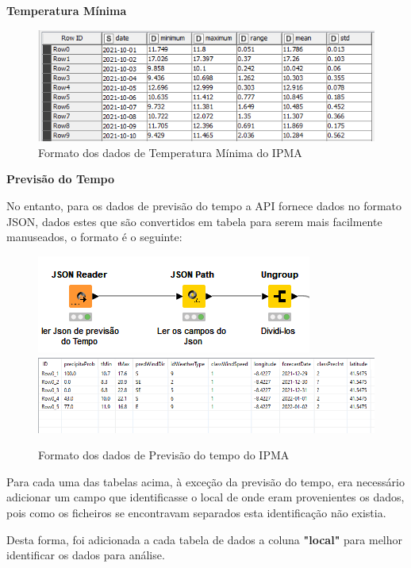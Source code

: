 \textbf{Temperatura Mínima}

\begin{figure}[H]
    \centering
    \includegraphics[scale=0.7]{imagens/TempMinFormatIPMA.png}
    \caption{Formato dos dados de Temperatura Mínima do IPMA}
\end{figure}

\newpage

\textbf{Previsão do Tempo}

No entanto, para os dados de previsão do tempo a API fornece dados no formato JSON, dados estes que são convertidos em tabela para serem mais facilmente manuseados, o formato é o seguinte:


\begin{figure}[H]
    \centering
    \includegraphics[]{imagens/PrevJsonFormatReader.png}
    \includegraphics[scale=0.6]{imagens/PrevFormatIPMA.png}
    \caption{Formato dos dados de Previsão do tempo do IPMA}
\end{figure}

Para cada uma das tabelas acima, à exceção da previsão do tempo, era ne\-cessário adicionar um campo que identificasse o local de onde eram provenientes os da\-dos, pois como os ficheiros se encontravam separados esta identificação não existia.

Desta forma, foi adicionada a cada tabela de dados a coluna \textbf{"local"} para melhor identificar os dados para análise.

